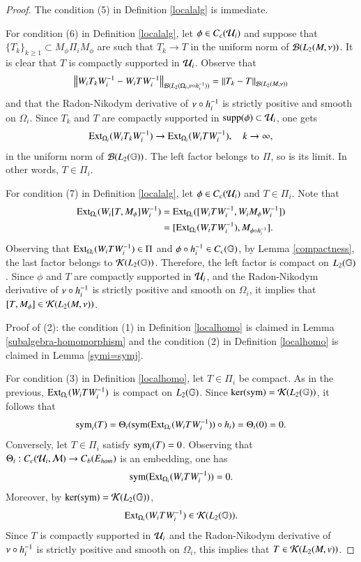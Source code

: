 \documentclass[leqno]{amsart}
\begin{document}
\begin{proof}
		The condition (5) in Definition \ref{localalg} is immediate.
		
		For condition (6) in Definition \ref{localalg}, let $\phi\in C_{c}({\mathcal U}_{i})$ and suppose that $\{T_{k}\}_{k\geq1}\subset M_{\phi}\Pi_{i} M_{\phi}$ are such that $T_{k}\to T$ in the uniform norm of ${\mathcal B}(L_{2}(M,\nu))$. It is clear that $T$ is compactly supported in ${\mathcal U}_{i}$. 
		Observe that $$\left\| W_{i}T_{k}W_{i}^{-1}-W_{i}TW_{i}^{-1} \right\|_{{\mathcal B}(L_{2}(\Omega_{i},\nu\circ h_{i}^{-1}))}=\left\| T_{k}-T \right\|_{{\mathcal B}(L_{2}(M,\nu))}$$ 
		and that the Radon-Nikodym derivative of $\nu\circ h_{i}^{-1}$ is strictly positive and smooth on $\Omega_{i}$.
		Since $T_{k}$ and $T$ are compactly supported in ${\rm supp}(\phi)\subset{\mathcal U}_{i}$, one gets $${\rm Ext}_{\Omega_{i}}(W_{i}T_{k}W_{i}^{-1})\to{\rm Ext}_{\Omega_{i}}(W_{i}TW_{i}^{-1}),\quad k\to\infty,$$ in the uniform norm of ${\mathcal B}(L_{2}(\mathbb{G}))$. The left factor belongs to $\Pi$, so is its limit. In other words, $T\in\Pi_{i}$.
		
		For condition (7) in Definition \ref{localalg}, let $\phi\in C_{c}({\mathcal U}_{i})$ and $T\in\Pi_{i}$. Note that
		\begin{align*}
			{\rm Ext}_{\Omega_{i}}(W_{i}[T,M_{\phi}]W_{i}^{-1})
			&={\rm Ext}_{\Omega_{i}}([W_{i}TW_{i}^{-1},W_{i}M_{\phi}W_{i}^{-1}])\\
			&=[{\rm Ext}_{\Omega_{i}}(W_{i}TW_{i}^{-1}),M_{\phi\circ h_{i}^{-1}}].
		\end{align*}
		Observing that ${\rm Ext}_{\Omega_{i}}(W_{i}TW_{i}^{-1})\in\Pi$ and $\phi\circ h_{i}^{-1}\in C_{c}(\mathbb{G})$, by Lemma \ref{compactness}, the last factor belongs to ${\mathcal K}(L_{2}(\mathbb{G}))$. Therefore, the left factor is compact on $L_{2}(\mathbb{G})$. Since $\phi$ and $T$ are compactly supported in ${\mathcal U}_{i}$, and the Radon-Nikodym derivative of $\nu\circ h_{i}^{-1}$ is strictly positive and smooth on $\Omega_{i}$, it implies that $[T,M_{\phi}]\in{\mathcal K}(L_{2}(M,\nu))$.
		
		
		
		
		\bigskip
		Proof of (2): the condition (1) in Definition \ref{localhomo} is claimed in Lemma \ref{subalgebra-homomorphism} and
		the condition (2) in Definition \ref{localhomo} is claimed in Lemma \ref{symi=symj}.
		
		
		For condition (3) in Definition \ref{localhomo}, let $T\in\Pi_{i}$ be compact. As in the previous, ${\rm Ext}_{\Omega_{i}}(W_{i}T W_{i}^{-1})$ is compact on $L_{2}(\mathbb{G})$. Since $\ker({\rm sym})={\mathcal K}(L_{2}(\mathbb{G}))$, it follows that 
		\begin{align*}
			{\rm sym}_{i}(T)=\Theta_{i}({\rm sym}({\rm Ext}_{\Omega_{i}}(W_{i}T W_{i}^{-1}))\circ h_{i})=\Theta_{i}(0)=0.
		\end{align*}
		Conversely, let $T\in\Pi_{i}$ satisfy ${\rm sym}_{i}(T)=0$. Observing that $\Theta_{i}:C_{c}({\mathcal U}_{i},{\mathcal M})\to C_{b}(E_{hom})$ is an embedding, one has $${\rm sym}({\rm Ext}_{\Omega_{i}}(W_{i}T W_{i}^{-1}))=0.$$
		Moreover, by $\ker({\rm sym})={\mathcal K}(L_{2}(\mathbb{G}))$, $${\rm Ext}_{\Omega_{i}}(W_{i}T W_{i}^{-1})\in{\mathcal K}(L_{2}(\mathbb{G})).$$
		Since $T$ is compactly supported in ${\mathcal U}_{i}$ and the Radon-Nikodym derivative of $\nu\circ h_{i}^{-1}$ is strictly positive and smooth on $\Omega_{i}$,
		this implies that $T\in{\mathcal K}(L_{2}(M,v))$. %
		

\end{proof}
\end{document}
